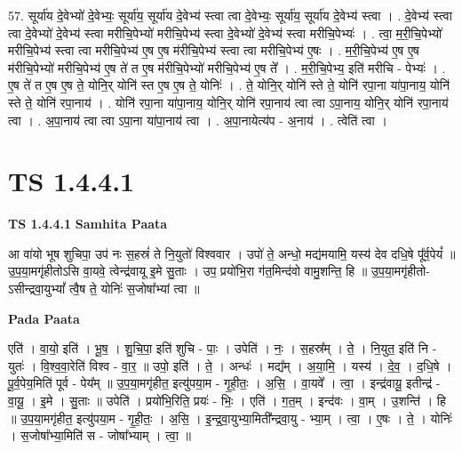 \documentclass[17pt]{extarticle}
\begin{document}
57. सूर्या॑य दे॒वेभ्यो॑ दे॒वेभ्यः॒ सूर्या॑य॒ सूर्या॑य दे॒वेभ्य॑ स्त्वा त्वा दे॒वेभ्यः॒ सूर्या॑य॒ सूर्या॑य दे॒वेभ्य॑ स्त्वा । . दे॒वेभ्य॑ स्त्वा त्वा दे॒वेभ्यो॑ दे॒वेभ्य॑ स्त्वा मरीचि॒पेभ्यो॑ मरीचि॒पेभ्य॑ स्त्वा दे॒वेभ्यो॑ दे॒वेभ्य॑ स्त्वा मरीचि॒पेभ्यः॑ । . त्वा॒ म॒री॒चि॒पेभ्यो॑ मरीचि॒पेभ्य॑ स्त्वा त्वा मरीचि॒पेभ्य॑ ए॒ष ए॒ष म॑रीचि॒पेभ्य॑ स्त्वा त्वा मरीचि॒पेभ्य॑ ए॒षः । . म॒री॒चि॒पेभ्य॑ ए॒ष ए॒ष म॑रीचि॒पेभ्यो॑ मरीचि॒पेभ्य॑ ए॒ष ते॑ त ए॒ष म॑रीचि॒पेभ्यो॑ मरीचि॒पेभ्य॑ ए॒ष ते᳚ । . म॒री॒चि॒पेभ्य॒ इति॑ मरीचि - पेभ्यः॑ । . ए॒ष ते॑ त ए॒ष ए॒ष ते॒ योनि॒र् योनि॑ स्त ए॒ष ए॒ष ते॒ योनिः॑ । . ते॒ योनि॒र् योनि॑ स्ते ते॒ योनि॑ रपा॒ना या॑पा॒नाय॒ योनि॑ स्ते ते॒ योनि॑ रपा॒नाय॑ । . योनि॑ रपा॒ना या॑पा॒नाय॒ योनि॒र् योनि॑ रपा॒नाय॑ त्वा त्वा ऽपा॒नाय॒ योनि॒र् योनि॑ रपा॒नाय॑ त्वा । . अ॒पा॒नाय॑ त्वा त्वा ऽपा॒ना या॑पा॒नाय॑ त्वा । . अ॒पा॒नायेत्य॑प - अ॒नाय॑ । . त्वेति॑ त्वा । \newline
\pagebreak
{}

\section{ TS 1.4.4.1 }

\textbf{TS 1.4.4.1 } \newline
\textbf{Samhita Paata} \newline

आ वा॑यो भूष शुचिपा॒ उप॑ नः स॒हस्रं॑ ते नि॒युतो॑ विश्ववार । उपो॑ ते॒ अन्धो॒ मद्य॑मयामि॒ यस्य॑ देव दधि॒षे पू᳚र्व॒पेयं᳚ ॥ उ॒प॒या॒मगृ॑हीतोऽसि वा॒यवे॒ त्वेन्द्र॑वायू इ॒मे सु॒ताः । उप॒ प्रयो॑भि॒रा ग॑त॒मिन्द॑वो वामु॒शन्ति॒ हि ॥ उ॒प॒या॒मगृ॑हीतो-ऽसीन्द्रवा॒युभ्यां᳚ त्वै॒ष ते॒ योनिः॑ स॒जोषा᳚भ्यां त्वा ॥ \newline

\textbf{Pada Paata} \newline

एति॑ । वा॒यो॒ इति॑ । भू॒ष॒ । शु॒चि॒पा॒ इति॑ शुचि - पाः॒ । उपेति॑ । नः॒ । स॒हस्र᳚म् । ते॒ । नि॒युत॒ इति॑ नि - युतः॑ । वि॒श्व॒वा॒रेति॑ विश्व - वा॒र॒ ॥ उपो॒ इति॑ । ते॒ । अन्धः॑ । मद्य᳚म् । अ॒या॒मि॒ । यस्य॑ । दे॒व॒ । द॒धि॒षे । पू॒र्व॒पेय॒मिति॑ पूर्व - पेय᳚म् ॥ उ॒प॒या॒मगृ॑हीत॒ इत्यु॑पया॒म - गृ॒ही॒तः॒ । अ॒सि॒ । वा॒यवे᳚ । त्वा॒ । इन्द्र॑वायू॒ इतीन्द्र॑ - वा॒यू॒ । इ॒मे । सु॒ताः ॥ उपेति॑ । प्रयो॑भि॒रिति॒ प्रयः॑ - भिः॒ । एति॑ । ग॒त॒म् । इन्द॑वः । वा॒म् । उ॒शन्ति॑ । हि ॥ उ॒प॒या॒मगृ॑हीत॒ इत्यु॑पया॒म - गृ॒ही॒तः॒ । अ॒सि॒ । इ॒न्द्र॒वा॒युभ्या॒मिती᳚न्द्रवा॒यु - भ्या॒म् । त्वा॒ । ए॒षः । ते॒ । योनिः॑ । स॒जोषा᳚भ्या॒मिति॑ स - जोषा᳚भ्याम् । त्वा॒ ॥  \newline
\end{document}
